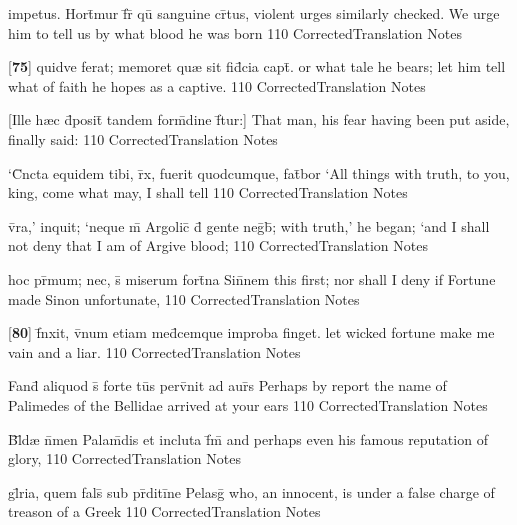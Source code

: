 \latline
  {impetus.  Hort\={}mur f\={}r\={\macron {\i}} qu\={} sanguine cr\={}tus,}
  { violent urges similarly checked.  We urge him to tell us by what blood he was born }
  {110}
  { CorrectedTranslation }
  { Notes }


\latline
  {[\textbf{75}] quidve ferat; memoret qu{\ae} sit fid\={}cia capt\={}.}
  { or what tale he bears; let him tell what of faith he hopes as a captive. }
  {110}
  { CorrectedTranslation }
  { Notes }


\latline
  {[Ille h{\ae}c d\={}posit\={} tandem form\={\macron {\i}}dine f\={}tur:] }
  { That man, his fear having been put aside, finally said: }
  {110}
  { CorrectedTranslation }
  { Notes }


\latline
  {`C\={}ncta equidem tibi, r\={}x, fuerit quodcumque, fat\={}bor}
  { `All things with truth, to you, king, come what may, I shall tell }
  {110}
  { CorrectedTranslation }
  { Notes }


\latline
  {v\={}ra,' inquit; `neque m\={} Argolic\={} d\={} gente neg\={}b\={};}
  { with truth,' he began; `and I shall not deny that I am of Argive blood;  }
  {110}
  { CorrectedTranslation }
  { Notes }


\latline
  {hoc pr\={\macron {\i}}mum; nec, s\={\macron {\i}} miserum fort\={}na Sin\={}nem}
  { this first; nor shall I deny if Fortune made Sinon unfortunate,  }
  {110}
  { CorrectedTranslation }
  { Notes }


\latline
  {[\textbf{80}] f\={\macron {\i}}nxit, v\={}num etiam med\={}cemque improba finget.}
  { let wicked fortune make me vain and a liar. }
  {110}
  { CorrectedTranslation }
  { Notes }


\latline
  {Fand\={} aliquod s\={\macron {\i}} forte tu\={}s perv\={}nit ad aur\={\macron {\i}}s}
  { Perhaps by report the name of Palimedes of the Bellidae arrived at your ears }
  {110}
  { CorrectedTranslation }
  { Notes }


\latline
  {B\={}l\={\macron {\i}}d{\ae} n\={}men Palam\={}dis et incluta f\={}m\={}}
  { and perhaps even his famous reputation of glory, }
  {110}
  { CorrectedTranslation }
  { Notes }


\latline
  {gl\={}ria, quem fals\={} sub pr\={}diti\={}ne Pelasg\={\macron {\i}}}
  { who, an innocent, is under a false charge of treason of a Greek }
  {110}
  { CorrectedTranslation }
  { Notes }


